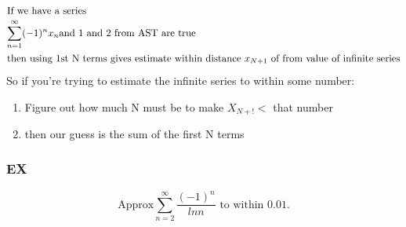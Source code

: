 \documentclass[12pt]{article}
\begin{document}
\\
\begin{align*}
        \shortintertext{If we have a series }
        \sum_{n=1}^{\infty} (-1)^{n} x_n \text{and 1 and 2 from AST are true} \\
        \shortintertext{then using 1st N terms gives estimate within distance $x_{N+1}$ of from value of infinite series} 
\end{align*}
So if you're trying to estimate the infinite series to within some number:
\begin{enumerate}
        \item Figure out how much N must be to make $X_{N+!} <$ that number  
        \item then our guess is the sum of the first N terms 
\end{enumerate}

\subsubsection*{EX}
\[
        \text{Approx} \sum_{n=2}^{\infty} \frac{(-1)^{n}}{ln n} \text{ to within 0.01}  
.\] 
\end{document}
